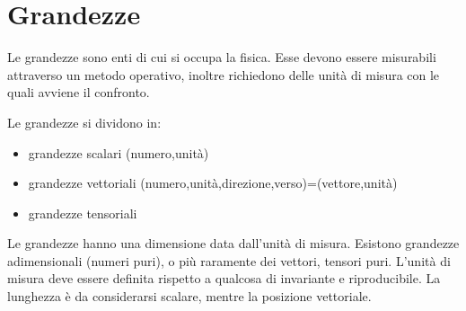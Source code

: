 \section{Grandezze}
Le grandezze sono enti di cui si occupa la fisica. Esse devono essere misurabili attraverso un metodo operativo, inoltre richiedono delle unità di misura con le quali avviene il confronto.
\newline\par
Le grandezze si dividono in:
\begin{itemize}
\item{}grandezze scalari (numero,unità)
\item{}grandezze vettoriali
(numero,unità,direzione,verso)=(vettore,unità)
\item{}grandezze tensoriali
\end{itemize}
Le grandezze hanno una dimensione data dall'unità di misura. Esistono grandezze adimensionali (numeri puri), o più raramente dei vettori, tensori puri. L'unità di misura deve essere definita rispetto a qualcosa di invariante e riproducibile. La lunghezza è da considerarsi scalare, mentre la posizione vettoriale.

